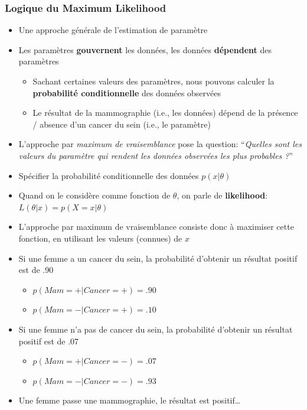 \documentclass[
  a4paper,11pt,twoside,onecolumn,openright,final,oldfontcommands]{memoir}
\providecommand{\tightlist}{%
  \setlength{\itemsep}{0pt}\setlength{\parskip}{0pt}}
\theoremstyle{definition}
\theoremstyle{definition}
\theoremstyle{definition}
\theoremstyle{definition}
\theoremstyle{remark}
\begin{document}
\hypertarget{logique-du-maximum-likelihood}{%
\subsubsection{Logique du Maximum Likelihood}\label{logique-du-maximum-likelihood}}

\begin{itemize}
\item
  Une approche générale de l'estimation de paramètre
\item
  Les paramètres \textbf{gouvernent} les données, les données \textbf{dépendent} des paramètres

  \begin{itemize}
  \tightlist
  \item
    Sachant certaines valeurs des paramètres, nous pouvons calculer la \textbf{probabilité conditionnelle} des données observées
  \item
    Le résultat de la mammographie (i.e., les données) dépend de la présence / absence d'un cancer du sein (i.e., le paramètre)
  \end{itemize}
\item
  L'approche par \emph{maximum de vraisemblance} pose la question: ``\emph{Quelles sont les valeurs du paramètre qui rendent les données observées les plus probables ?}''
\item
  Spécifier la probabilité conditionnelle des données \(p(x|\theta)\)
\item
  Quand on le considère comme fonction de \(\theta\), on parle de \textbf{likelihood}: \(L(\theta|x) = p(X = x|\theta)\)
\item
  L'approche par maximum de vraisemblance consiste donc à maximiser cette fonction, en utilisant les valeurs (connues) de \(x\)
\item
  Si une femme a un cancer du sein, la probabilité d'obtenir un résultat positif est de .90

  \begin{itemize}
  \tightlist
  \item
    \(p(Mam=+|Cancer=+)=.90\)
  \item
    \(p(Mam=-|Cancer=+)=.10\)
  \end{itemize}
\item
  Si une femme n'a pas de cancer du sein, la probabilité d'obtenir un résultat positif est de .07

  \begin{itemize}
  \tightlist
  \item
    \(p(Mam=+|Cancer=-)=.07\)
  \item
    \(p(Mam=-|Cancer=-)=.93\)
  \end{itemize}
\item
  Une femme passe une mammographie, le résultat est positif\ldots{}


\end{itemize}
\end{document}
